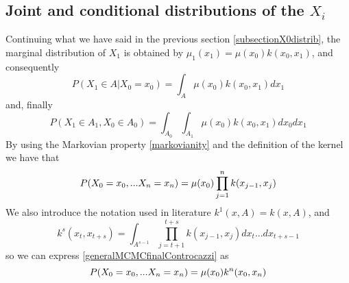 \documentclass[12pt,mythesisstyle]{report}
\begin{document}
\subsection{Joint and conditional distributions of the $X_i$}
Continuing what we have said in the previous section \ref{subsectionX0distrib}, the marginal distribution of $X_1$ is obtained by  $\mu_1(x_1)=\mu(x_0)k(x_0,x_1)$, and consequently \cite{RobertCasella} 
\begin{equation}
P(X_1 \in A|X_0=x_0)=\int_A \mu(x_0)k(x_0,x_1) dx_1
\end{equation}
and, finally
\begin{equation}
P(X_1 \in A_1, X_0 \in A_0)=\int_{A_0} \int_{A_1} \mu(x_0)k(x_0,x_1) dx_0dx_1
\end{equation}
By using the Markovian property \eqref{markovianity} and the definition of the kernel we have that \cite{mcmcnotes}
\begin{equation}\label{generalMCMCfinalControcazzi} 
P(X_0=x_0,...X_n=x_n)= \\
\mu(x_0)\prod_{j=1}^{n}k(x_{j-1},x_j)
\end{equation}
We also introduce the notation used in literature \cite{RobertCasella} \cite{mcmcnotes} $k^1(x,A)=k(x,A)$, and
\begin{equation}\label{kernelN}
k^s(x_t,x_{t+s})=\int_{A^{s-1}} \prod_{j=t+1}^{t+s} k(x_{j-1},x_j)dx_t...dx_{t+s-1}
\end{equation}
so we can express \eqref{generalMCMCfinalControcazzi} as
\begin{equation}\label{generalMCMCfinalControcazziEconkenne}
P(X_0=x_0,...X_n=x_n)= \\
\mu(x_0)k^n(x_{0},x_n)
\end{equation}
\end{document}
